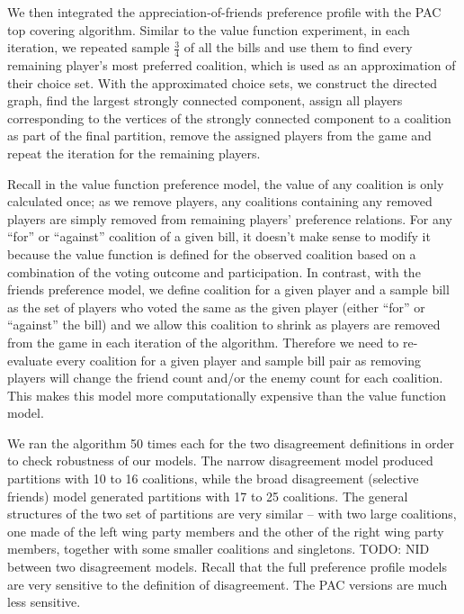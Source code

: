 \documentclass[letterpaper]{article} %
\begin{document}
We then integrated the appreciation-of-friends preference profile with the PAC top covering algorithm. Similar to the value function experiment, in each iteration, we repeated sample $\frac{3}{4}$ of all the bills and use them to find every remaining player's most preferred coalition, which is used as an approximation of their choice set. With the approximated choice sets, we construct the directed graph, find the largest strongly connected component, assign all players corresponding to the vertices of the strongly connected component to a coalition as part of the final partition, remove the assigned players from the game and repeat the iteration for the remaining players.

Recall in the value function preference model, the value of any coalition is only calculated once; as we remove players, any coalitions containing any removed players are simply removed from remaining players' preference relations. For any ``for'' or ``against'' coalition of a given bill, it doesn't make sense to modify it because the value function is defined for the observed coalition based on a combination of the voting outcome and participation. In contrast, with the friends preference model, we define coalition for a given player and a sample bill as the set of players who voted the same as the given player (either ``for'' or ``against'' the bill) and we allow this coalition to shrink as players are removed from the game in each iteration of the algorithm. Therefore we need to re-evaluate every coalition for a given player and sample bill pair as removing players will change the friend count and/or the enemy count for each coalition. This makes this model more computationally expensive than the value function model.

We ran the algorithm 50 times each for the two disagreement definitions in order to check robustness of our models. The narrow disagreement model produced partitions with 10 to 16 coalitions, while the broad disagreement (selective friends) model generated partitions with 17 to 25 coalitions. The general structures of the two set of partitions are very similar – with two large coalitions, one made of the left wing party members and the other of the right wing party members, together with some smaller coalitions and singletons. TODO: NID between two disagreement models. Recall that the full preference profile models are very sensitive to the definition of disagreement. The PAC versions are much less sensitive.
\end{document}
